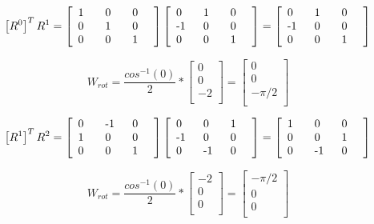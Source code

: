 \documentclass[a4paper,10pt]{article}
\begin{document}
\[
\left[R^0\right]^T R^1
=
\left[\begin{array}{*{3}{p{0.5cm}}}
  1 & 0 & 0\\
  0 & 1 & 0\\
  0 & 0 & 1\\
\end{array}\right]
\left[\begin{array}{*{3}{p{0.5cm}}}
  0 & 1 & 0\\
 -1 & 0 & 0\\
  0 & 0 & 1\\
\end{array}\right]
=
\left[\begin{array}{*{3}{p{0.5cm}}}
  0 & 1 & 0\\
 -1 & 0 & 0\\
  0 & 0 & 1\\
\end{array}\right]
\]

\[
 W_{rot} = 
 \frac{cos^{-1}(0)}{2} *  
 \left[\begin{array}{c}
  0\\
  0\\
  -2\\
 \end{array}\right] =
 \left[\begin{array}{c}
  0\\
  0\\
  -\pi/2\\
 \end{array}\right] 
\]

\[
\left[R^1\right]^T R^2
=
\left[\begin{array}{*{3}{p{0.5cm}}}
  0 &-1 & 0\\
  1 & 0 & 0\\
  0 & 0 & 1\\
\end{array}\right]
\left[\begin{array}{*{3}{p{0.5cm}}}
  0 & 0 & 1\\
 -1 & 0 & 0\\
  0 &-1 & 0\\
\end{array}\right]
=
\left[\begin{array}{*{3}{p{0.5cm}}}
  1 & 0 & 0\\
  0 & 0 & 1\\
  0 &-1 & 0\\
\end{array}\right]
\] 

\[
 W_{rot} = 
 \frac{cos^{-1}(0)}{2} *
 \left[\begin{array}{c}
  -2\\
  0\\
  0\\
 \end{array}\right] 
 =
 \left[\begin{array}{c}
  -\pi/2\\
  0\\
  0\\
 \end{array}\right] 
\]
\end{document}
